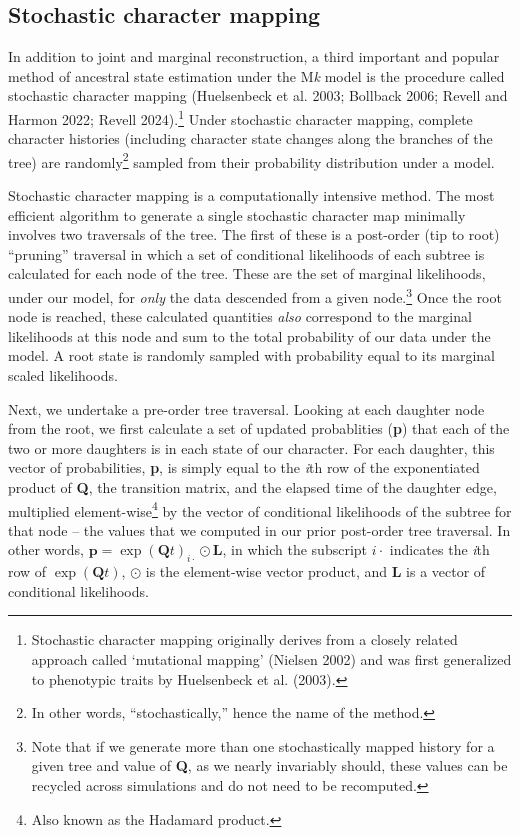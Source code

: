 \documentclass{article}
\begin{document}
\subsection{Stochastic character mapping}\label{stochastic-character-mapping}

In addition to joint and marginal reconstruction, a third important and popular method of ancestral state estimation under the M\emph{k} model is the procedure called stochastic character mapping (Huelsenbeck et al. 2003; Bollback 2006; Revell and Harmon 2022; Revell 2024).\footnote{Stochastic character mapping originally derives from a closely related approach called `mutational mapping' (Nielsen 2002) and was first generalized to phenotypic traits by Huelsenbeck et al. (2003).} Under stochastic character mapping, complete character histories (including character state changes along the branches of the tree) are randomly\footnote{In other words, ``stochastically,'' hence the name of the method.} sampled from their probability distribution under a model.

Stochastic character mapping is a computationally intensive method. The most efficient algorithm to generate a single stochastic character map minimally involves two traversals of the tree. The first of these is a post-order (tip to root) ``pruning'' traversal in which a set of conditional likelihoods of each subtree is calculated for each node of the tree. These are the set of marginal likelihoods, under our model, for \emph{only} the data descended from a given node.\footnote{Note that if we generate more than one stochastically mapped history for a given tree and value of \textbf{Q}, as we nearly invariably should, these values can be recycled across simulations and do not need to be recomputed.} Once the root node is reached, these calculated quantities \emph{also} correspond to the marginal likelihoods at this node and sum to the total probability of our data under the model. A root state is randomly sampled with probability equal to its marginal scaled likelihoods.

Next, we undertake a pre-order tree traversal. Looking at each daughter node from the root, we first calculate a set of updated probablities (\textbf{p}) that each of the two or more daughters is in each state of our character. For each daughter, this vector of probabilities, \textbf{p}, is simply equal to the \emph{i}th row of the exponentiated product of \textbf{Q}, the transition matrix, and the elapsed time of the daughter edge, multiplied element-wise\footnote{Also known as the Hadamard product.} by the vector of conditional likelihoods of the subtree for that node -- the values that we computed in our prior post-order tree traversal. In other words, \(\mathbf{p} = \exp(\mathbf{Q}t)_{i\cdot} \odot \mathbf{L}\), in which the subscript \(i\cdot\) indicates the \emph{i}th row of \(\exp(\mathbf{Q}t)\), \(\odot\) is the element-wise vector product, and \textbf{L} is a vector of conditional likelihoods.
\end{document}
